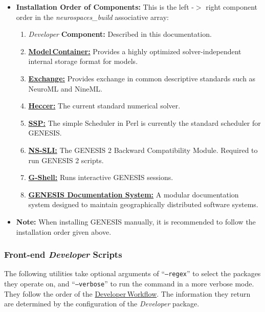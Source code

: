 \documentclass[12pt]{article}
\begin{document}
\begin{itemize}
   \item {\bf Installation Order of Components:} This is the left -$>$ right component order in the {\it neurospaces\_build} associative array:
   \begin{enumerate}
      \item {\it Developer} {\bf Component:} Described in this documentation.
      \item \href{../model-container/model-container.tex}{\bf Model\,Container:} Provides a highly optimized solver-independent internal storage format for models.
      \item \href{../exchange/exchange.tex}{\bf Exchange:} Provides exchange in common descriptive standards such as NeuroML and NineML.
      \item \href{../heccer/heccer.tex}{\bf Heccer:} The current standard numerical solver.
      \item \href{../ssp/ssp.tex}{\bf SSP:} The simple Scheduler in Perl is currently the standard scheduler for GENESIS.
      \item \href{../ns-sli/ns-sli.tex}{\bf NS-SLI:} The GENESIS 2 Backward Compatibility Module. Required to run GENESIS 2 scripts.
      \item \href{../gshell/gshell.tex}{\bf G-Shell:} Runs interactive GENESIS sessions.
      \item \href{../documentation-overview/documentation-overview.tex}{\bf GENESIS Documentation System:} A modular documentation system designed to maintain geographically distributed software systems.
   \end{enumerate}
   \item {\bf Note:} When installing GENESIS manually, it is recommended to follow the installation order given above. 
\end{itemize}


\subsubsection*{Front-end {\it Developer} Scripts}

The following utilities take optional arguments of ``{\tt --regex}'' to select the packages they operate on, and ``{\tt --verbose}'' to run the command in a more verbose mode. They follow the order of the \href{../workflow-developer/workflow-developer.tex}{Developer\,Workflow}. The information they return are determined by the configuration of the {\it Developer} package.
\end{document}
